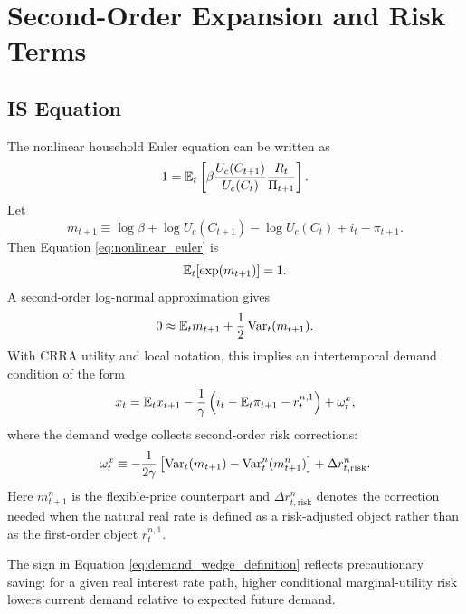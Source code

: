 \section{Second-Order Expansion and Risk Terms}

\subsection{IS Equation}

The nonlinear household Euler equation can be written as
\begin{equation}
    1
    =
    \mathbb{E}_t
    \left[
        \beta
        \frac{U_c(C_{t+1})}{U_c(C_t)}
        \frac{R_t}{\Pi_{t+1}}
    \right].
    \label{eq:nonlinear_euler}
\end{equation}
Let
\begin{equation}
    m_{t+1}
    \equiv
    \log\beta
    +
    \log U_c(C_{t+1})
    -
    \log U_c(C_t)
    +
    i_t
    -
    \pi_{t+1}.
    \label{eq:log_sdf_return}
\end{equation}
Then Equation \eqref{eq:nonlinear_euler} is
\begin{equation}
    \mathbb{E}_t[\exp(m_{t+1})]=1.
\end{equation}
A second-order log-normal approximation gives
\begin{equation}
    0
    \approx
    \mathbb{E}_t m_{t+1}
    +
    \frac{1}{2}\operatorname{Var}_t(m_{t+1}).
    \label{eq:second_order_euler}
\end{equation}
With CRRA utility and local notation, this implies an intertemporal demand
condition of the form
\begin{equation}
    x_t
    =
    \mathbb{E}_t x_{t+1}
    -
    \frac{1}{\gamma}
    \left(
        i_t-\mathbb{E}_t\pi_{t+1}-r^{n,1}_t
    \right)
    +
    \omega^x_t,
    \label{eq:is_with_wedge}
\end{equation}
where the demand wedge collects second-order risk corrections:
\begin{equation}
    \omega^x_t
    \equiv
    -\frac{1}{2\gamma}
    \left[
        \operatorname{Var}_t(m_{t+1})
        -
        \operatorname{Var}^n_t(m^n_{t+1})
    \right]
    +
    \Delta r^n_{t,\mathrm{risk}}.
    \label{eq:demand_wedge_definition}
\end{equation}
Here \(m^n_{t+1}\) is the flexible-price counterpart and
\(\Delta r^n_{t,\mathrm{risk}}\) denotes the correction needed when the natural
real rate is defined as a risk-adjusted object rather than as the first-order
object \(r^{n,1}_t\).

The sign in Equation \eqref{eq:demand_wedge_definition} reflects precautionary
saving: for a given real interest rate path, higher conditional marginal-utility
risk lowers current demand relative to expected future demand.

